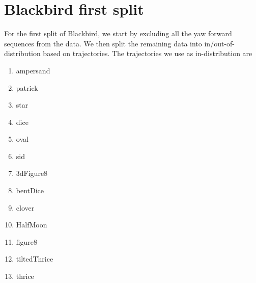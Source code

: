 \section{Blackbird first split}
\label{app:blkbrd_split}

For the first split of Blackbird, we start by excluding all the yaw forward sequences from the data. We then split the remaining data into in/out-of-distribution based on trajectories. The trajectories we use as in-distribution are
\begin{enumerate}
    \item ampersand 
    \item patrick
    \item star
    \item dice
    \item oval
    \item sid
    \item 3dFigure8
    \item bentDice
    \item clover
    \item HalfMoon
    \item figure8
    \item tiltedThrice
    \item thrice
\end{enumerate}{}
